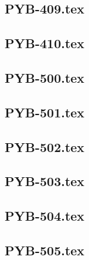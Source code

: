 \renewcommand{\xxexo}{PYB-409.tex} 
\subsection*{\xxexo} 
\graphicspath{{../../exospython_bases/equadiffs/\xxexo/}}
 
 
\renewcommand{\xxexo}{PYB-410.tex} 
\subsection*{\xxexo} 
\graphicspath{{../../exospython_bases/equadiffs/\xxexo/}}
 
 
\renewcommand{\xxexo}{PYB-500.tex} 
\subsection*{\xxexo} 
\graphicspath{{../../exospython_bases/equadiffs/\xxexo/}}
 
 
\renewcommand{\xxexo}{PYB-501.tex} 
\subsection*{\xxexo} 
\graphicspath{{../../exospython_bases/equadiffs/\xxexo/}}
 
 
\renewcommand{\xxexo}{PYB-502.tex} 
\subsection*{\xxexo} 
\graphicspath{{../../exospython_bases/equadiffs/\xxexo/}}
 
 
\renewcommand{\xxexo}{PYB-503.tex} 
\subsection*{\xxexo} 
\graphicspath{{../../exospython_bases/equadiffs/\xxexo/}}
 
 
\renewcommand{\xxexo}{PYB-504.tex} 
\subsection*{\xxexo} 
\graphicspath{{../../exospython_bases/equadiffs/\xxexo/}}
 
 
\renewcommand{\xxexo}{PYB-505.tex} 
\subsection*{\xxexo} 
\graphicspath{{../../exospython_bases/equadiffs/\xxexo/}}
 
 
